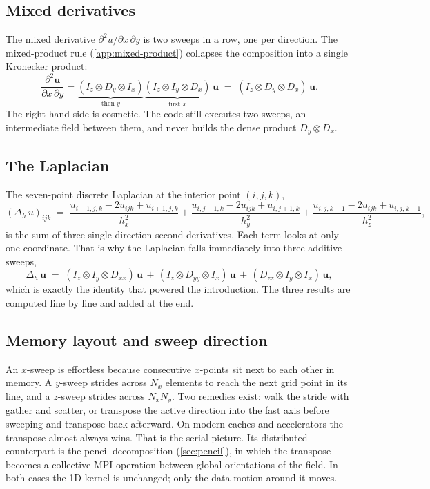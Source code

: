 \documentclass[11pt]{article}
\newcommand{\kron}{\otimes}
\newcommand{\Dx}{D_{x}}
\newcommand{\Dy}{D_{y}}
\newcommand{\Dxx}{D_{xx}}
\newcommand{\Dyy}{D_{yy}}
\newcommand{\Dzz}{D_{zz}}
\newcommand{\Ix}{I_{x}}
\newcommand{\Iy}{I_{y}}
\newcommand{\Iz}{I_{z}}
\newcommand{\Lap}{\Delta_h}
\begin{document}
\subsection{Mixed derivatives}
\label{sec:3d-mixed}

The mixed derivative $\partial^2 u / \partial x\,\partial y$ is
two sweeps in a row, one per direction.  The mixed-product rule
(\cref{app:mixed-product}) collapses the composition into a single
Kronecker product:
\begin{equation}
\label{eq:3d-Dxy}
  \frac{\partial^2 \bm{u}}{\partial x\,\partial y}
  =
  \underbrace{(\Iz \kron \Dy \kron \Ix)}_{\text{then } y}
  \underbrace{(\Iz \kron \Iy \kron \Dx)}_{\text{first } x}\,\bm{u}
  \;=\;
  (\Iz \kron \Dy \kron \Dx)\,\bm{u}.
\end{equation}
The right-hand side is cosmetic.  The code still executes two
sweeps, an intermediate field between them, and never builds the
dense product $\Dy \kron \Dx$.

\subsection{The Laplacian}
\label{sec:3d-laplacian}

The seven-point discrete Laplacian at the interior point $(i,j,k)$,
\begin{equation}
\label{eq:laplacian-pointwise}
  (\Lap\,u)_{ijk}
  \;=\;
  \frac{u_{i-1,j,k} {-} 2u_{ijk} {+} u_{i+1,j,k}}{h_x^2}
  + \frac{u_{i,j-1,k} {-} 2u_{ijk} {+} u_{i,j+1,k}}{h_y^2}
  + \frac{u_{i,j,k-1} {-} 2u_{ijk} {+} u_{i,j,k+1}}{h_z^2},
\end{equation}
is the sum of three single-direction second derivatives.  Each term
looks at only one coordinate.  That is why the Laplacian falls
immediately into three additive sweeps,
\begin{equation}
\label{eq:3d-laplacian}
    \Lap\,\bm{u}
    \;=\;
    (\Iz \kron \Iy \kron \Dxx)\,\bm{u}
    \,+\,
    (\Iz \kron \Dyy \kron \Ix)\,\bm{u}
    \,+\,
    (\Dzz \kron \Iy \kron \Ix)\,\bm{u},
\end{equation}
which is exactly the identity that powered the introduction.  The
three results are computed line by line and added at the end.

\subsection{Memory layout and sweep direction}
\label{sec:memory}

An $x$-sweep is effortless because consecutive $x$-points sit next
to each other in memory.  A $y$-sweep strides across $N_x$ elements
to reach the next grid point in its line, and a $z$-sweep strides
across $N_x N_y$.  Two remedies exist: walk the stride with gather
and scatter, or transpose the active direction into the fast axis
before sweeping and transpose back afterward.  On modern caches and
accelerators the transpose almost always wins.  That is the serial
picture.  Its distributed counterpart is the pencil decomposition
(\cref{sec:pencil}), in which the transpose becomes a collective
MPI operation between global orientations of the field.  In both
cases the 1D kernel is unchanged; only the data motion around it
moves.
\end{document}

